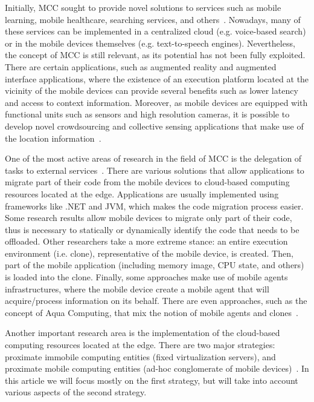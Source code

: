 \documentclass[twocolumn,preprint,3p]{elsarticle}
\begin{document}
Initially, MCC sought to provide novel solutions to services such as mobile learning, mobile healthcare, searching services, and others~\cite{Dinh13}. Nowadays, many of these services can be implemented in a centralized cloud (e.g. voice-based search) or in the mobile devices themselves (e.g. text-to-speech engines). Nevertheless, the concept of MCC is still relevant, as its potential has not been fully exploited. There are certain applications, such as augmented reality and augmented interface applications, where the existence of an execution platform located at the vicinity of the mobile devices can provide several benefits such as lower latency and access to context information. Moreover, as mobile devices are equipped with functional units such as sensors and high resolution cameras, it is possible to develop novel crowdsourcing and collective sensing applications that make use of the location information~\cite{WangMCC15}.

One of the most active areas of research in the field of MCC is the delegation of tasks to external services~\cite{Rahimi14}. There are various solutions that allow applications to migrate part of their code from the mobile devices to cloud-based computing resources located at the edge. Applications are usually implemented using frameworks like .NET and JVM, which makes the code migration process easier. Some research results allow mobile devices to migrate only part of their code, thus is necessary to statically or dynamically identify the code that needs to be offloaded. Other researchers take a more extreme stance: an entire execution environment (i.e. clone), representative of the mobile device, is created. Then, part of the mobile application (including memory image, CPU state, and others) is loaded into the clone. Finally, some approaches make use of mobile agents infrastructures, where the mobile device create a mobile agent that will acquire/process information on its behalf. There are even approaches, such as the concept of Aqua Computing, that mix the notion of mobile agents and clones~\cite{Magurawalage15}.

Another important research area is the implementation of the cloud-based computing resources located at the edge. There are two major strategies: proximate immobile computing entities (fixed virtualization servers), and proximate mobile computing entities (ad-hoc conglomerate of mobile devices)~\cite{Abolfazli14}. In this article we will focus mostly on the first strategy, but will take into account various aspects of the second strategy.
\end{document}
